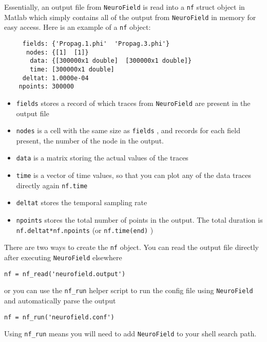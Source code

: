 \documentclass[12pt,a4paper]{article}
\newcommand{\type}[1]{ {\small\small\tt #1} }
\newcommand{\NF}[0]{ \type{NeuroField}}
\begin{document}
Essentially, an output file from \NF is read into a \type{nf} struct object in Matlab which simply contains all of the output from \NF in memory for easy access. Here is an example of a \type{nf} object:
\begin{lstlisting}
     fields: {'Propag.1.phi'  'Propag.3.phi'}
      nodes: {[1]  [1]}
       data: {[300000x1 double]  [300000x1 double]}
       time: [300000x1 double]
     deltat: 1.0000e-04
    npoints: 300000
\end{lstlisting}
\begin{itemize}
\item \type{fields} stores a record of which traces from \NF are present in the output file
\item \type{nodes} is a cell with the same size as \type{fields}, and records for each field present, the number of the node in the output. 
\item \type{data} is a matrix storing the actual values of the traces
\item \type{time} is a vector of time values, so that you can plot any of the data traces directly again \type{nf.time}
\item \type{deltat} stores the temporal sampling rate
\item \type{npoints} stores the total number of points in the output. The total duration is \type{nf.deltat*nf.npoints} (or  \type{nf.time(end)})
\end{itemize}

There are two ways to create the \type{nf} object. You can read the output file directly after executing \NF elsewhere

\begin{lstlisting}
nf = nf_read('neurofield.output')
\end{lstlisting}

or you can use the \type{nf\_run} helper script to run the config file using \NF and automatically parse the output

\begin{lstlisting}
nf = nf_run('neurofield.conf')
\end{lstlisting}

Using \type{nf\_run} means you will need to add \NF to your shell search path.
\end{document}
